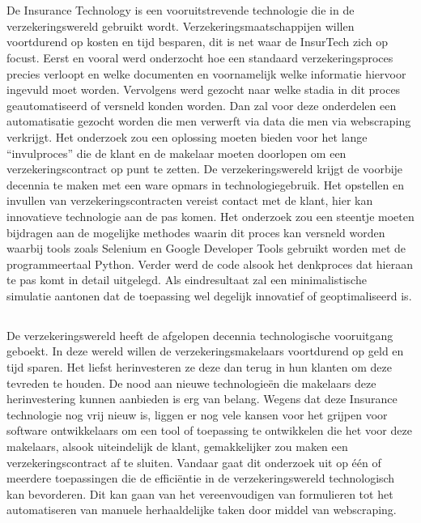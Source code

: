 
\chapter{}
\label{ch:inleiding}

De Insurance Technology is een vooruitstrevende technologie die in de verzekeringswereld gebruikt wordt. Verzekeringsmaatschappijen willen voortdurend op kosten en tijd besparen, dit is net waar de InsurTech zich op focust. Eerst en vooral werd onderzocht hoe een standaard verzekeringsproces precies verloopt en welke documenten en voornamelijk welke informatie hiervoor ingevuld moet worden. Vervolgens werd gezocht naar welke stadia in dit proces geautomatiseerd of versneld konden worden. Dan zal voor deze onderdelen een automatisatie gezocht worden die men verwerft via data die men via webscraping verkrijgt. Het onderzoek zou een oplossing moeten bieden voor het lange “invulproces” die de klant en de makelaar moeten doorlopen om een verzekeringscontract op punt te zetten. De verzekeringswereld krijgt de voorbije decennia te maken met een ware opmars in technologiegebruik. Het opstellen en invullen van verzekeringscontracten vereist contact met de klant, hier kan innovatieve technologie aan de pas komen. Het onderzoek zou een steentje moeten bijdragen aan de mogelijke methodes waarin dit proces kan versneld worden waarbij tools zoals Selenium en Google Developer Tools gebruikt worden met de programmeertaal Python. Verder werd de code alsook het denkproces dat hieraan te pas komt in detail uitgelegd. Als eindresultaat zal een minimalistische simulatie aantonen dat de toepassing wel degelijk innovatief of geoptimaliseerd is.

\section{}
\label{sec:probleemstelling}

De verzekeringswereld heeft de afgelopen decennia technologische vooruitgang geboekt.
In deze wereld willen de verzekeringsmakelaars voortdurend op geld en tijd sparen. Het liefst herinvesteren ze deze dan terug in hun klanten om deze tevreden te houden. De nood aan nieuwe technologieën die makelaars deze herinvestering kunnen aanbieden is erg van belang. Wegens dat deze Insurance technologie nog vrij nieuw is, liggen er nog vele kansen voor het grijpen voor software ontwikkelaars om een tool of toepassing te ontwikkelen die het voor deze makelaars, alsook uiteindelijk de klant, gemakkelijker zou maken een verzekeringscontract af te sluiten. Vandaar gaat dit onderzoek uit op één of meerdere toepassingen die de efficiëntie in de verzekeringswereld technologisch kan bevorderen. Dit kan gaan van het vereenvoudigen van formulieren tot het automatiseren van manuele herhaaldelijke taken door middel van webscraping.

